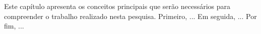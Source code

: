 Este capítulo apresenta os conceitos principais que serão necessários para compreender o trabalho realizado nesta pesquisa. 
Primeiro, ... 
Em seguida, ... 
Por fim, ... 





